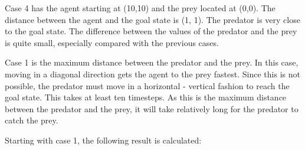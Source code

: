\documentclass{article}
\begin{document}
Case 4 has the agent starting at (10,10) and the prey located at (0,0). The distance between the agent and the goal state is (1, 1). The predator is very close to the goal state. The difference between the values of the predator and the prey is quite small, especially compared with the previous cases.  \\

\iffalse

Case 1 is the maximum distance between the predator and the prey. In this case, moving in a diagonal direction gets the agent to the prey fastest. Since this is not possible, the predator must move in a horizontal - vertical fashion to reach the goal state. This takes at least ten timesteps. As this is the maximum distance between the predator and the prey, it will take relatively long for the predator to catch the prey.

Starting with case 1, the following result is calculated:
\end{document}
